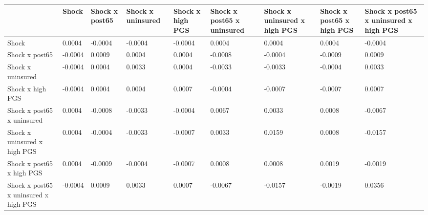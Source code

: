 % 
\begin{tabular}{p{5cm}p{2cm}p{2cm}p{2cm}p{2cm}p{2cm}p{2cm}p{2cm}p{2cm}}
  \hline
 & Shock & Shock x post65 & Shock x uninsured & Shock x high PGS & Shock x post65 x uninsured & Shock x uninsured x high PGS &  Shock x post65 x high PGS & Shock x post65 x uninsured x high PGS \\ 
  \hline
Shock & 0.0004 & -0.0004 & -0.0004 & -0.0004 & 0.0004 & 0.0004 & 0.0004 & -0.0004 \\ 
  Shock x post65 & -0.0004 & 0.0009 & 0.0004 & 0.0004 & -0.0008 & -0.0004 & -0.0009 & 0.0009 \\ 
  Shock x uninsured & -0.0004 & 0.0004 & 0.0033 & 0.0004 & -0.0033 & -0.0033 & -0.0004 & 0.0033 \\ 
  Shock x high PGS & -0.0004 & 0.0004 & 0.0004 & 0.0007 & -0.0004 & -0.0007 & -0.0007 & 0.0007 \\ 
  Shock x post65 x uninsured & 0.0004 & -0.0008 & -0.0033 & -0.0004 & 0.0067 & 0.0033 & 0.0008 & -0.0067 \\ 
  Shock x uninsured x high PGS & 0.0004 & -0.0004 & -0.0033 & -0.0007 & 0.0033 & 0.0159 & 0.0008 & -0.0157 \\ 
   Shock x post65 x high PGS & 0.0004 & -0.0009 & -0.0004 & -0.0007 & 0.0008 & 0.0008 & 0.0019 & -0.0019 \\ 
  Shock x post65 x uninsured x high PGS & -0.0004 & 0.0009 & 0.0033 & 0.0007 & -0.0067 & -0.0157 & -0.0019 & 0.0356 \\ 
   \hline
\end{tabular}
